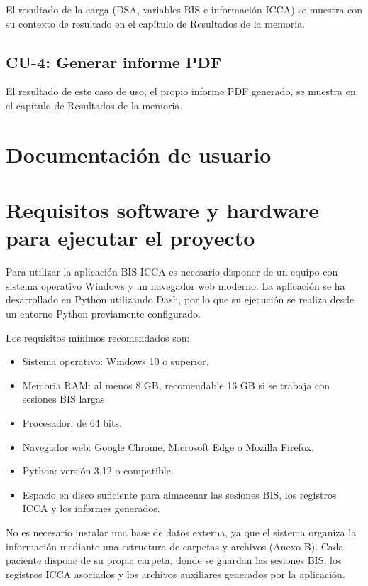 \documentclass[
  spanish,
  a4paper,
  12pt,
  twoside]{memoir}
\providecommand{\tightlist}{%
  \setlength{\itemsep}{0pt}\setlength{\parskip}{0pt}}
\newcommand{\apendice}[1]{\chapter{#1}}
\begin{document}
El resultado de la carga (DSA, variables BIS e información ICCA) se
muestra con su contexto de resultado en el capítulo de Resultados de la
memoria.

\section{CU-4: Generar informe PDF}\label{cu-4-generar-informe-pdf}

El resultado de este caso de uso, el propio informe PDF generado, se
muestra en el capítulo de Resultados de la memoria.


\apendice{Documentación de usuario}

\chapter{Requisitos software y hardware para ejecutar el
proyecto}\label{requisitos-software-y-hardware-para-ejecutar-el-proyecto}

Para utilizar la aplicación BIS-ICCA es necesario disponer de un equipo
con sistema operativo Windows y un navegador web moderno. La aplicación
se ha desarrollado en Python utilizando Dash, por lo que su ejecución se
realiza desde un entorno Python previamente configurado.

Los requisitos mínimos recomendados son:

\begin{itemize}
\tightlist
\item
  Sistema operativo: Windows 10 o superior.
\item
  Memoria RAM: al menos 8 GB, recomendable 16 GB si se trabaja con
  sesiones BIS largas.
\item
  Procesador: de 64 bits.
\item
  Navegador web: Google Chrome, Microsoft Edge o Mozilla Firefox.
\item
  Python: versión 3.12 o compatible.
\item
  Espacio en disco suficiente para almacenar las sesiones BIS, los
  registros ICCA y los informes generados.
\end{itemize}

No es necesario instalar una base de datos externa, ya que el sistema
organiza la información mediante una estructura de carpetas y archivos
(Anexo B). Cada paciente dispone de su propia carpeta, donde se guardan
las sesiones BIS, los registros ICCA asociados y los archivos auxiliares
generados por la aplicación.
\end{document}
